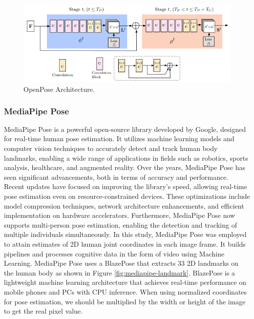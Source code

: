 \begin{figure}[ht]
  \centering
  \includegraphics[scale=1.1]{gambar/openpose_architecture.png}
  \caption{OpenPose Architecture.}
  \label{fig:openpose-architecture}
\end{figure}

\subsubsection{MediaPipe Pose}
\label{subsec:mediapipepose}

MediaPipe Pose is a powerful open-source library developed by Google, designed for real-time human pose estimation. It utilizes machine learning models and computer vision techniques to accurately detect and track human body landmarks, enabling a wide range of applications in fields such as robotics, sports analysis, healthcare, and augmented reality. 
Over the years, MediaPipe Pose has seen significant advancements, both in terms of accuracy and performance. Recent updates have focused on improving the library's speed, allowing real-time pose estimation even on resource-constrained devices. These optimizations include model compression techniques, network architecture enhancements, and efficient implementation on hardware accelerators. Furthermore, MediaPipe Pose now supports multi-person pose estimation, enabling the detection and tracking of multiple individuals simultaneously.
In this study, MediaPipe Pose was employed to attain estimates of 2D human joint coordinates in each image frame. It builds pipelines and processes cognitive data in the form of video using Machine Learning. MediaPipe Pose uses a BlazePose that extracts 33 2D landmarks on the human body as shown in Figure \ref{fig:mediapipe-landmark}. BlazePose is a lightweight machine learning architecture that achieves real-time performance on mobile phones and PCs with CPU inference.
When using normalized coordinates for pose estimation, we should be multiplied by the width or height of the image to get the real pixel value.

